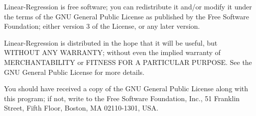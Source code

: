 Linear-\/\+Regression is free software; you can redistribute it and/or modify it under the terms of the G\+N\+U General Public License as published by the Free Software Foundation; either version 3 of the License, or any later version.

Linear-\/\+Regression is distributed in the hope that it will be useful, but W\+I\+T\+H\+O\+U\+T A\+N\+Y W\+A\+R\+R\+A\+N\+T\+Y; without even the implied warranty of M\+E\+R\+C\+H\+A\+N\+T\+A\+B\+I\+L\+I\+T\+Y or F\+I\+T\+N\+E\+S\+S F\+O\+R A P\+A\+R\+T\+I\+C\+U\+L\+A\+R P\+U\+R\+P\+O\+S\+E. See the G\+N\+U General Public License for more details.

You should have received a copy of the G\+N\+U General Public License along with this program; if not, write to the Free Software Foundation, Inc., 51 Franklin Street, Fifth Floor, Boston, M\+A 02110-\/1301, U\+S\+A. 